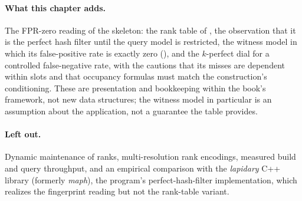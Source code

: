 \paragraph{What this chapter adds.}
The FPR-zero reading of the skeleton: the rank table of ,
the observation that it is the perfect hash filter until the query model
is restricted, the witness model in which its false-positive rate is
exactly zero (), and the $k$-perfect dial
for a controlled false-negative rate, with the cautions that its misses
are dependent within slots and that occupancy formulas must match the
construction's conditioning. These are presentation and bookkeeping
within the book's framework, not new data structures; the witness model
in particular is an assumption about the application, not a guarantee
the table provides.

\paragraph{Left out.}
Dynamic maintenance of ranks, multi-resolution rank encodings, measured
build and query throughput, and an empirical comparison with the
\emph{lapidary} C++ library (formerly \emph{maph}), the program's
perfect-hash-filter implementation, which realizes the fingerprint
reading but not the rank-table variant.

